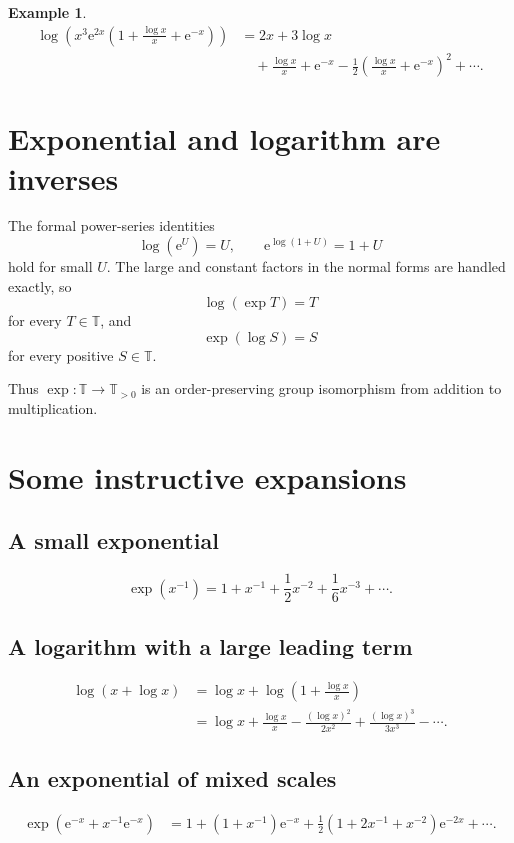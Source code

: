 \documentclass[11pt,oneside]{book}
\theoremstyle{definition}
\newtheorem{example}[theorem]{Example}
\theoremstyle{remark}
\newcommand{\T}{\mathbb{T}}
\newcommand{\e}{\mathrm{e}}
\begin{document}
\begin{example}
\begin{align*}
 \log\left(x^3\e^{2x}
   \left(1+\frac{\log x}{x}+\e^{-x}\right)\right)
 &=2x+3\log x\\
 &\quad+\frac{\log x}{x}+\e^{-x}
 -\frac12\left(\frac{\log x}{x}+\e^{-x}\right)^2+\cdots.
\end{align*}
\end{example}

\section{Exponential and logarithm are inverses}

The formal power-series identities
\[
  \log(\e^U)=U,
  \qquad
  \e^{\log(1+U)}=1+U
\]
hold for small $U$. The large and constant factors in the normal forms are
handled exactly, so
\[
  \log(\exp T)=T
\]
for every $T\in\T$, and
\[
  \exp(\log S)=S
\]
for every positive $S\in\T$.

Thus $\exp:\T\to\T_{>0}$ is an order-preserving group isomorphism from
addition to multiplication.

\section{Some instructive expansions}

\subsection{A small exponential}
\[
  \exp(x^{-1})
  =1+x^{-1}+\frac{1}{2}x^{-2}+\frac{1}{6}x^{-3}+\cdots.
\]

\subsection{A logarithm with a large leading term}
\begin{align*}
  \log(x+\log x)
  &=\log x+\log\left(1+\frac{\log x}{x}\right)\\
  &=\log x+\frac{\log x}{x}
     -\frac{(\log x)^2}{2x^2}
     +\frac{(\log x)^3}{3x^3}-\cdots.
\end{align*}

\subsection{An exponential of mixed scales}
\begin{align*}
 \exp\left(\e^{-x}+x^{-1}\e^{-x}\right)
 &=1+(1+x^{-1})\e^{-x}
   +\frac12(1+2x^{-1}+x^{-2})\e^{-2x}+\cdots.
\end{align*}
\end{document}
